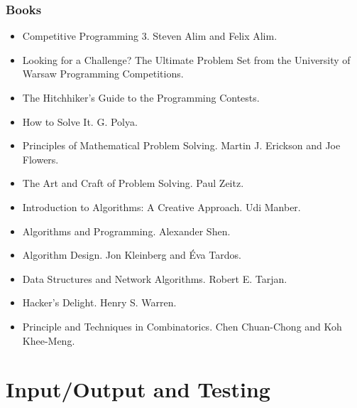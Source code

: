 \documentclass{beamer}
\begin{document}
\begin{frame}[containsverbatim]
\frametitle{Books}

\footnotesize

\begin{itemize}

\item Competitive Programming 3. Steven Alim and Felix Alim.

\item Looking for a Challenge? The Ultimate Problem Set from the University of Warsaw Programming Competitions.

\item The Hitchhiker’s Guide to the Programming Contests.

\item How to Solve It. G. Polya.

\item Principles of Mathematical Problem Solving. Martin J. Erickson and Joe Flowers.

\item The Art and Craft of Problem Solving. Paul Zeitz.

\item Introduction to Algorithms: A Creative Approach. Udi Manber.

\item Algorithms and Programming. Alexander Shen.

\item Algorithm Design. Jon Kleinberg and \'Eva Tardos.

\item Data Structures and Network Algorithms. Robert E. Tarjan.

\item Hacker's Delight. Henry S. Warren.

\item Principle and Techniques in Combinatorics. Chen Chuan-Chong and Koh Khee-Meng.

\end{itemize}

\end{frame}

\section{Input/Output and Testing}
\end{document}
